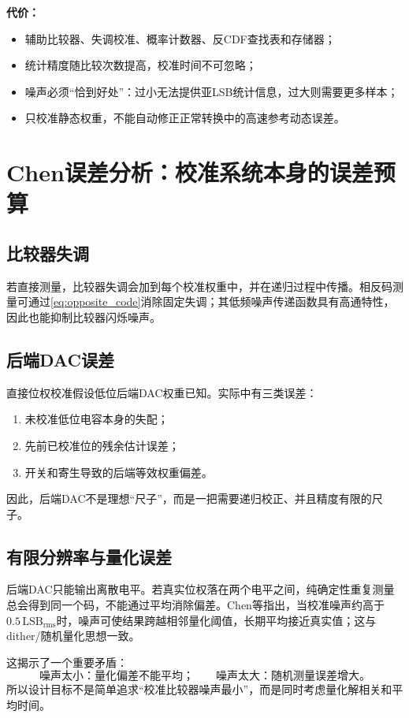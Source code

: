 \documentclass[UTF8,a4paper,11pt]{ctexart}
\newcommand{\LSB}{\mathrm{LSB}}
\begin{document}
\textbf{代价：}
\begin{itemize}
  \item 辅助比较器、失调校准、概率计数器、反CDF查找表和存储器；
  \item 统计精度随比较次数提高，校准时间不可忽略；
  \item 噪声必须“恰到好处”：过小无法提供亚LSB统计信息，过大则需要更多样本；
  \item 只校准静态权重，不能自动修正正常转换中的高速参考动态误差。
\end{itemize}

\section{Chen误差分析：校准系统本身的误差预算}

\subsection{比较器失调}

若直接测量，比较器失调会加到每个校准权重中，并在递归过程中传播。相反码测量可通过\cref{eq:opposite_code}消除固定失调；其低频噪声传递函数具有高通特性，因此也能抑制比较器闪烁噪声。\cite{chen2024}

\subsection{后端DAC误差}

直接位权校准假设低位后端DAC权重已知。实际中有三类误差：
\begin{enumerate}
  \item 未校准低位电容本身的失配；
  \item 先前已校准位的残余估计误差；
  \item 开关和寄生导致的后端等效权重偏差。
\end{enumerate}
因此，后端DAC不是理想“尺子”，而是一把需要递归校正、并且精度有限的尺子。

\subsection{有限分辨率与量化误差}

后端DAC只能输出离散电平。若真实位权落在两个电平之间，纯确定性重复测量总会得到同一个码，不能通过平均消除偏差。Chen等指出，当校准噪声约高于$0.5\,\LSB_{\mathrm{rms}}$时，噪声可使结果跨越相邻量化阈值，长期平均接近真实值；这与dither/随机量化思想一致。\cite{chen2024}

这揭示了一个重要矛盾：
\begin{equation}
\text{噪声太小：量化偏差不能平均；}\qquad
\text{噪声太大：随机测量误差增大。}
\end{equation}
所以设计目标不是简单追求“校准比较器噪声最小”，而是同时考虑量化解相关和平均时间。
\end{document}
